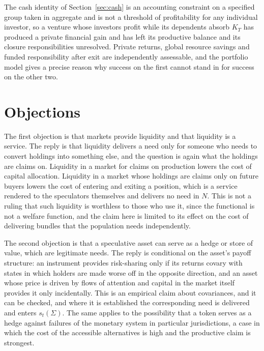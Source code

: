 \documentclass[11pt]{article}
\theoremstyle{remark}
\begin{document}
The cash identity of Section~\ref{sec:cash} is an accounting constraint on a specified group taken in aggregate and is not a threshold of profitability for any individual investor, so a venture whose investors profit while its dependents absorb $K_T$ has produced a private financial gain and has left its productive balance and its closure responsibilities unresolved. Private returns, global resource savings and funded responsibility after exit are independently assessable, and the portfolio model gives a precise reason why success on the first cannot stand in for success on the other two.

\section{Objections}\label{sec:objections}

The first objection is that markets provide liquidity and that liquidity is a service. The reply is that liquidity delivers a need only for someone who needs to convert holdings into something else, and the question is again what the holdings are claims on. Liquidity in a market for claims on production lowers the cost of capital allocation. Liquidity in a market whose holdings are claims only on future buyers lowers the cost of entering and exiting a position, which is a service rendered to the speculators themselves and delivers no need in $N$. This is not a ruling that such liquidity is worthless to those who use it, since the functional is not a welfare function, and the claim here is limited to its effect on the cost of delivering bundles that the population needs independently.

The second objection is that a speculative asset can serve as a hedge or store of value, which are legitimate needs. The reply is conditional on the asset's payoff structure: an instrument provides risk-sharing only if its returns covary with states in which holders are made worse off in the opposite direction, and an asset whose price is driven by flows of attention and capital in the market itself provides it only incidentally. This is an empirical claim about covariances, and it can be checked, and where it is established the corresponding need is delivered and enters $s_t(\Sigma)$. The same applies to the possibility that a token serves as a hedge against failures of the monetary system in particular jurisdictions, a case in which the cost of the accessible alternatives is high and the productive claim is strongest.
\end{document}
